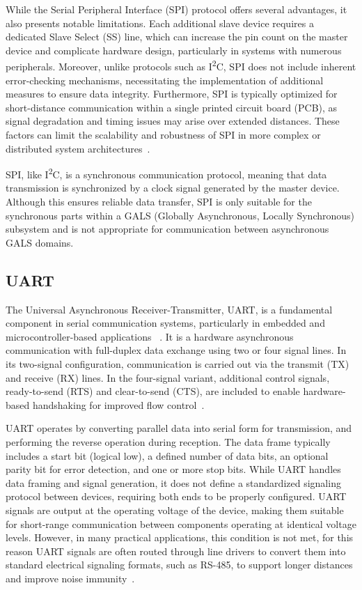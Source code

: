 While the Serial Peripheral Interface (SPI) protocol offers several advantages, it also presents notable limitations. Each additional slave device requires a dedicated Slave Select (SS) line, which can increase the pin count on the master device and complicate hardware design, particularly in systems with numerous peripherals. Moreover, unlike protocols such as  I\textsuperscript{2}C, SPI does not include inherent error-checking mechanisms, necessitating the implementation of additional measures to ensure data integrity. Furthermore, SPI is typically optimized for short-distance communication within a single printed circuit board (PCB), as signal degradation and timing issues may arise over extended distances. These factors can limit the scalability and robustness of SPI in more complex or distributed system architectures~\cite{spisite2}.


SPI, like I\textsuperscript{2}C, is a synchronous communication protocol, meaning that data transmission is synchronized by a clock signal generated by the master device. Although this ensures reliable data transfer, SPI is only suitable for the synchronous parts within a GALS (Globally Asynchronous, Locally Synchronous) subsystem and is not appropriate for communication between asynchronous GALS domains.

\subsection{UART}
\label{sub:uart}

The Universal Asynchronous Receiver-Transmitter, UART, is a fundamental component in serial communication systems, particularly in embedded and microcontroller-based applications ~\cite{UARTwiki}. It is a hardware asynchronous communication with full-duplex data exchange using two or four signal lines. In its two-signal configuration, communication is carried out via the transmit (TX) and receive (RX) lines. In the four-signal variant, additional control signals, ready-to-send (RTS) and clear-to-send (CTS), are included to enable hardware-based handshaking for improved flow control~\cite{Rao2021}.

UART operates by converting parallel data into serial form for transmission, and performing the reverse operation during reception. The data frame typically includes a start bit (logical low), a defined number of data bits, an optional parity bit for error detection, and one or more stop bits. While UART handles data framing and signal generation, it does not define a standardized signaling protocol between devices, requiring both ends to be properly configured. UART signals are output at the operating voltage of the device, making them suitable for short-range communication between components operating at identical voltage levels. However, in many practical applications, this condition is not met, for this reason  UART signals are often routed through line drivers to convert them into standard electrical signaling formats, such as RS-485, to support longer distances and improve noise immunity~\cite{Rao2021}.

